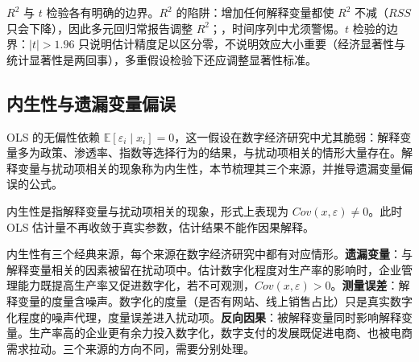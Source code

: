 $R^2$ 与 $t$ 检验各有明确的边界。$R^2$ 的陷阱：增加任何解释变量都使 $R^2$ 不减（$RSS$ 只会下降），因此多元回归常报告调整 $R^2$；，时间序列中尤须警惕。$t$ 检验的边界：$|t| > 1.96$ 只说明估计精度足以区分零，不说明效应大小重要（经济显著性与统计显著性是两回事），多重假设检验下还应调整显著性标准。

\subsection{内生性与遗漏变量偏误}

OLS 的无偏性依赖 $\mathbb{E}[\varepsilon_i \mid x_i] = 0$，这一假设在数字经济研究中尤其脆弱：解释变量多为政策、渗透率、指数等选择行为的结果，与扰动项相关的情形大量存在。解释变量与扰动项相关的现象称为内生性，本节梳理其三个来源，并推导遗漏变量偏误的公式。

\begin{definition}
内生性是指解释变量与扰动项相关的现象，形式上表现为 $Cov(x, \varepsilon) \neq 0$。此时 OLS 估计量不再收敛于真实参数，估计结果不能作因果解释。
\end{definition}

内生性有三个经典来源，每个来源在数字经济研究中都有对应情形。\textbf{遗漏变量}：与解释变量相关的因素被留在扰动项中。估计数字化程度对生产率的影响时，企业管理能力既提高生产率又促进数字化，若不可观测，$Cov(x, \varepsilon) > 0$。\textbf{测量误差}：解释变量的度量含噪声。数字化的度量（是否有网站、线上销售占比）只是真实数字化程度的噪声代理，度量误差进入扰动项。\textbf{反向因果}：被解释变量同时影响解释变量。生产率高的企业更有余力投入数字化，数字支付的发展既促进电商、也被电商需求拉动。三个来源的方向不同，需要分别处理。

